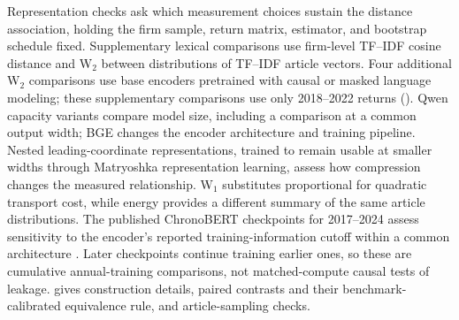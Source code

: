 Representation checks ask which measurement choices sustain the distance
association, holding the firm sample, return matrix, estimator, and bootstrap
schedule fixed.
Supplementary lexical comparisons use firm-level TF--IDF cosine distance
and W$_2$ between distributions of TF--IDF article vectors.
Four additional W$_2$ comparisons use base encoders pretrained with causal
or masked language modeling; these supplementary comparisons use only
2018--2022 returns ().
Qwen capacity variants compare model size, including a comparison at a common
output width; BGE changes the encoder architecture and training pipeline.
Nested leading-coordinate representations, trained to remain usable at
smaller widths through Matryoshka representation learning, assess how
compression changes the measured relationship.
W$_1$ substitutes proportional for quadratic transport cost, while energy
provides a different summary of the same article distributions.
The published ChronoBERT checkpoints for 2017--2024 assess sensitivity to the
encoder's reported training-information cutoff within a common architecture
\citep{he_chronobert_2025}.
Later checkpoints continue training earlier ones, so these are cumulative
annual-training comparisons, not matched-compute causal tests of leakage.
 gives construction details, paired
contrasts and their benchmark-calibrated equivalence rule, and
article-sampling checks.
